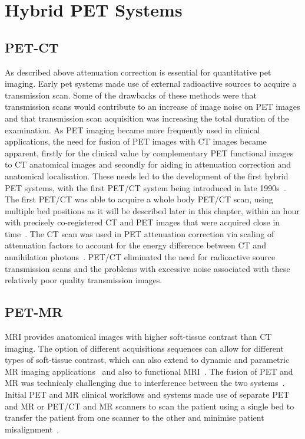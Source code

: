 \section{Hybrid PET Systems}
\subsection{PET-CT}
As described above attenuation correction is essential for quantitative \gls{pet} imaging. Early \gls{pet} systems made use of external radioactive sources to acquire a transmission scan. Some of the drawbacks of these methods were that transmission scans would contribute to an increase of image noise on PET images and that transmission scan acquisition was increasing the total duration of the examination.
As PET imaging became more frequently used in clinical applications, the need for fusion of PET images with CT images became apparent, firstly for the clinical value by complementary PET functional images to CT anatomical images and secondly for aiding in attenuation correction and anatomical localisation. These needs led to the development of the first hybrid PET systems, with the first PET/CT system being introduced in late 1990s~\cite{Townsend2008}.
The first PET/CT was able to acquire a whole body PET/CT scan, using multiple bed positions as it will be described later in this chapter, within an hour with precisely co-registered CT and PET images that were acquired close in time~\cite{Beyer2000}. The CT scan was used in PET attenuation correction via scaling of attenuation factors to account for the energy difference between CT and annihilation photons~\cite{Kinahan1998}. PET/CT eliminated the need for radioactive source transmission scans and the problems with excessive noise associated with these relatively poor quality transmission images.

\subsection{PET-MR}
\label{sec:PET_MR_Systems}
MRI provides anatomical images with higher soft-tissue contrast than CT imaging. The option of different acquisitions sequences can allow for different types of soft-tissue contrast, which can also extend to dynamic and parametric MR imaging applications~\cite{Besson2020} and also to functional MRI~\cite{Kolb2012}.
The fusion of PET and MR was technicaly challenging due to interference between the two systems~\cite{Disselhorst2014}.
Initial PET and MR clinical workflows and systems made use of separate PET and MR or PET/CT and MR scanners to scan the patient using a single bed to transfer the patient from one scanner to the other and minimise patient misalignment~\cite{Zaidi2011,Veit-Haibach2013}.

